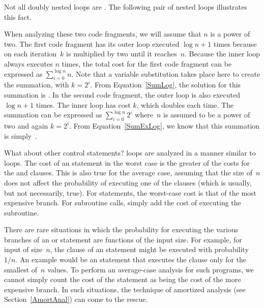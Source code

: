 \begin{example}
Not all doubly nested  loops are \Thetantwo.
The following pair of nested loops illustrates this fact.


When analyzing these two code fragments, we will assume that \(n\) is
a power of two.
The first code fragment has its outer  loop executed
\(\log n+1\) times because on each iteration~\(k\) is multiplied by
two until it reaches~\(n\).
Because the inner loop always executes \(n\) times, the total cost for
the first code fragment can be expressed as
\(\sum_{i=0}^{\log n} n\).
Note that a variable substitution takes place here to create the
summation, with \(k = 2^i\).
From Equation~\ref{SumLog}, the solution for this summation is
\Thetanlogn.
In the second code fragment, the outer loop is also executed
\(\log n+1\) times.
The inner loop has cost \(k\), which doubles each time.
The summation can be expressed as \(\sum_{i=0}^{\log n} 2^i\)
where~\(n\) is assumed to be a power of two and again
\(k = 2^i\).
From Equation~\ref{SumExLog}, we know that this summation is
simply~\Thetan.
\end{example}

What about other control statements?
 loops are analyzed in a manner similar to 
loops.
The cost of an  statement in the worst case is the greater of
the costs for the  and  clauses.
This is also true for the average case, assuming that
the size of~\(n\) does not affect the probability of executing one of
the clauses (which is usually, but not necessarily, true).
For  statements, the worst-case cost is that of the most
expensive branch.
For subroutine calls, simply add the cost of executing the subroutine.

There are rare situations in which the probability for executing the
various branches of an  or  statement are
functions of the input size.
For example, for input of size~\(n\), the  clause of an
 statement might be executed with probability \(1/n\).
An example would be an  statement that executes the
 clause only for the smallest of~\(n\) values.
To perform an average-case analysis for such programs,
we cannot simply count the cost of the 
statement as being the cost of the more expensive branch.
In such situations, the technique of
amortized analysis
(see Section~\ref{AmortAnal}) can come to the rescue.

